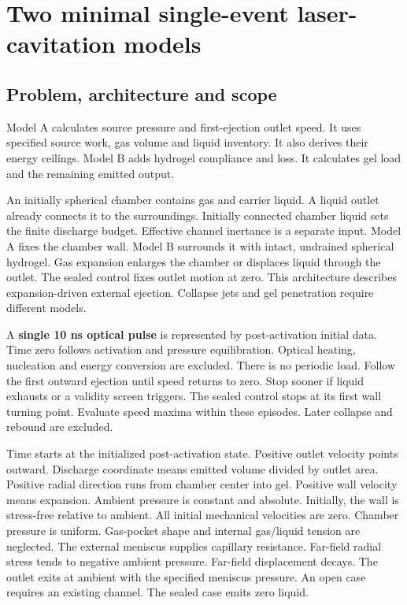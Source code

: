 \documentclass[11pt]{article}
\begin{document}
\section*{Two minimal single-event laser-cavitation models}


\subsection*{Problem, architecture and scope}

Model A calculates source pressure and first-ejection outlet speed. It uses specified source work, gas volume and liquid inventory. It also derives their energy ceilings. Model B adds hydrogel compliance and loss. It calculates gel load and the remaining emitted output.


An initially spherical chamber contains gas and carrier liquid. A liquid outlet already connects it to the surroundings. Initially connected chamber liquid sets the finite discharge budget. Effective channel inertance is a separate input. Model A fixes the chamber wall. Model B surrounds it with intact, undrained spherical hydrogel. Gas expansion enlarges the chamber or displaces liquid through the outlet. The sealed control fixes outlet motion at zero. This architecture describes expansion-driven external ejection. Collapse jets and gel penetration require different models.


A \textbf{single 10 ns optical pulse} is represented by post-activation initial data. Time zero follows activation and pressure equilibration. Optical heating, nucleation and energy conversion are excluded. There is no periodic load. Follow the first outward ejection until speed returns to zero. Stop sooner if liquid exhausts or a validity screen triggers. The sealed control stops at its first wall turning point. Evaluate speed maxima within these episodes. Later collapse and rebound are excluded.


Time starts at the initialized post-activation state. Positive outlet velocity points outward. Discharge coordinate means emitted volume divided by outlet area. Positive radial direction runs from chamber center into gel. Positive wall velocity means expansion. Ambient pressure is constant and absolute. Initially, the wall is stress-free relative to ambient. All initial mechanical velocities are zero. Chamber pressure is uniform. Gas-pocket shape and internal gas/liquid tension are neglected. The external meniscus supplies capillary resistance. Far-field radial stress tends to negative ambient pressure. Far-field displacement decays. The outlet exits at ambient with the specified meniscus pressure. An open case requires an existing channel. The sealed case emits zero liquid.
\end{document}

